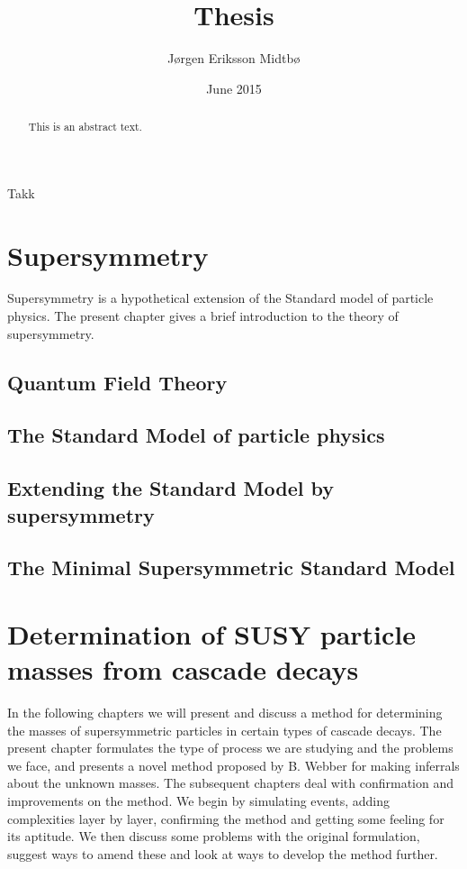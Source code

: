 \documentclass[twoside,english]{uiofysmaster}
\author{J\o rgen Eriksson Midtb\o}
\title{Thesis}
\date{June 2015}
\begin{document}
\lstset{language=Python}


\cleardoublepage

\begin{abstract}
This is an abstract text.
\end{abstract}


\begin{acknowledgements}
  Takk
\end{acknowledgements}

\tableofcontents
\listoffigures
\listoftables


\chapter{Supersymmetry}
Supersymmetry is a hypothetical extension of the Standard model of particle physics. The present chapter gives a brief introduction to the theory of supersymmetry. \cite{Batzing:2013}

\section{Quantum Field Theory}


\section{The Standard Model of particle physics}


\section{Extending the Standard Model by supersymmetry}


\section{The Minimal Supersymmetric Standard Model}





\chapter{Determination of SUSY particle masses from cascade decays}
In the following chapters we will present and discuss a method for determining the masses of supersymmetric particles in certain types of cascade decays. The present chapter formulates the type of process we are studying and the problems we face, and presents a novel method proposed by B. Webber \cite{Webber:2009vm} for making inferrals about the unknown masses. The subsequent chapters deal with confirmation and improvements on the method. We begin by simulating events, adding complexities layer by layer, confirming the method and getting some feeling for its aptitude. We then discuss some problems with the original formulation, suggest ways to amend these and look at ways to develop the method further.
\end{document}
